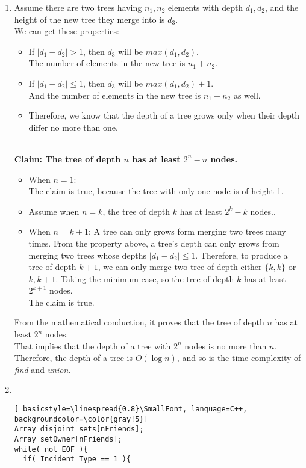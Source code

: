 \documentclass[fleqn,a4paper,12pt]{article}
\begin{document}
\begin{enumerate}
  \item
    Assume there are two trees having $n_1,n_2$ elements with depth $d_1,d_2$,
    and the height of the new tree they merge into is $d_3$.\\
    We can get these properties:\\
    \begin{itemize}
      \item 
        If $ | d_1 - d_2 | > 1 $, then $d_3$ will be $max( d_1,d_2)$.\\
        The number of elements in the new tree is $n_1+n_2$.
      \item
        If $  | d_1 - d_2 | \leq 1 $, then $d_3$ will be $max( d_1,d_2) + 1 $.\\
        And the number of elements in the new tree is $n_1+n_2$ as well.
      \item
        Therefore, we know that the depth of a tree grows only when their depth differ no more than one.
      \end{itemize}
      \ \\
      \textbf{Claim: The tree of depth $n$ has at least $2^n-n$ nodes.}
      \begin{itemize}
      \item When $n=1$:\\ 
        The claim is true, because the tree with only one node is of height 1.
      \item Assume when $n=k$, the tree of depth $k$ has at least $2^k-k$ nodes..
      \item When $n=k+1$:
          A tree can only grows form merging two trees many times. From the property above, a tree's depth can only grows from merging two trees whose depths $| d_1 - d_2 | \leq 1$. Therefore, to produce a tree of depth $k+1$, we can only merge two tree of depth either $\{ k, k\}$ or ${ k, k+1}$. Taking the minimum case, so the tree of depth $k$ has at least $2^{k+1}$ nodes. \\The claim is true.          
    \end{itemize}
    From the mathematical conduction, it proves that the tree of depth $n$ has at least $2^n$ nodes. \\That implies that the depth of a tree with $2^n$ nodes is no more than $n$. Therefore, the depth of a tree is $O(\log n)$, and so is the time complexity of \textit{find} and \textit{union}.
    
    \item
      \ \\
      \begin{lstlisting}[ basicstyle=\linespread{0.8}\SmallFont, language=C++, backgroundcolor=\color{gray!5}]
Array disjoint_sets[nFriends];
Array setOwner[nFriends];
while( not EOF ){
  if( Incident_Type == 1 ){


\end{lstlisting}
\end{enumerate}
\end{document}
